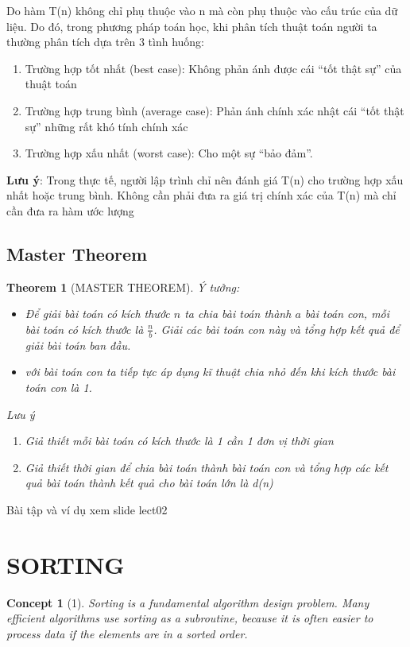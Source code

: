 \documentclass{article}
\newtheorem*{theorem}{Theorem}
\newtheorem*{concept}{Concept}
\begin{document}
Do hàm T(n) không chỉ phụ thuộc vào n mà còn phụ thuộc vào cấu trúc của dữ liệu. Do đó, trong phương pháp toán học, khi phân tích thuật toán người ta thường phân tích dựa trên 3 tình huống:
\begin{enumerate}
    \item Trường hợp tốt nhất (best case): Không phản ánh được cái “tốt thật sự” của thuật toán
    \item Trường hợp trung bình (average case): Phản ánh chính xác nhật cái “tốt thật sự” những rất khó tính chính xác
    \item Trường hợp xấu nhất (worst case): Cho một sự “bảo đảm”.
\end{enumerate}

\textbf{Lưu ý}:
Trong thực tế, người lập trình chỉ nên đánh giá T(n) cho trường hợp xấu nhất hoặc trung bình. Không cần phải đưa ra giá trị chính xác của T(n) mà chỉ cần
đưa ra hàm ước lượng

\subsection{Master Theorem}

\begin{theorem}[MASTER THEOREM]
 \;

Ý tưởng:
\begin{itemize}
    \item Để giải bài toán có kích thước $n$ ta chia bài toán thành $a$ bài toán con, mỗi bài toán có kích thước là $\frac{n}{b}$. Giải các bài toán con này và tổng hợp kết quả để giải bài toán ban đầu.
    
    \item với bài toán con ta tiếp tực áp dụng kĩ thuật chia nhỏ đến khi kích thước bài toán con là 1.
\end{itemize}

Lưu ý
\begin{enumerate}
    \item Giả thiết mỗi bài toán có kích thước là 1 cần 1 đơn vị thời gian
    \item Giả thiết thời gian để chia bài toán thành bài toán con và tổng hợp các kết quả bài toán thành kết quả cho bài toán lớn là d(n)
\end{enumerate}
\end{theorem}


Bài tập và ví dụ xem slide lect02

\section{SORTING}
\begin{concept}[1]
    Sorting is a fundamental algorithm design problem. Many efficient algorithms use sorting as a subroutine, because it is often easier to process data if the elements are in a sorted order.
\end{concept}
\end{document}
